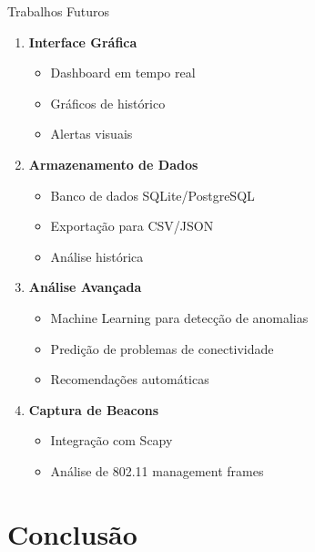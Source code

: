 \documentclass[aspectratio=169]{beamer}
\begin{document}
\begin{frame}{Trabalhos Futuros}
\begin{enumerate}
    \item \textbf{Interface Gráfica}
    \begin{itemize}
        \item Dashboard em tempo real
        \item Gráficos de histórico
        \item Alertas visuais
    \end{itemize}
    
    \item \textbf{Armazenamento de Dados}
    \begin{itemize}
        \item Banco de dados SQLite/PostgreSQL
        \item Exportação para CSV/JSON
        \item Análise histórica
    \end{itemize}
    
    \item \textbf{Análise Avançada}
    \begin{itemize}
        \item Machine Learning para detecção de anomalias
        \item Predição de problemas de conectividade
        \item Recomendações automáticas
    \end{itemize}
    
    \item \textbf{Captura de Beacons}
    \begin{itemize}
        \item Integração com Scapy
        \item Análise de 802.11 management frames
    \end{itemize}
\end{enumerate}
\end{frame}

\section{Conclusão}
\end{document}
